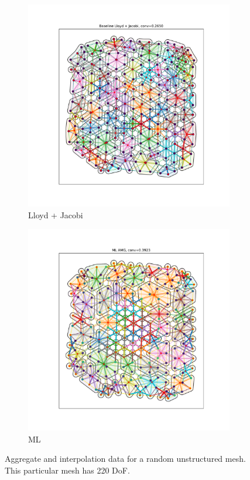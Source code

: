 \documentclass{article}
\begin{document}
\begin{figure}[h]
  \centering
  \begin{subfigure}[t]{0.49\textwidth}
    \centering
    \includegraphics[width=\textwidth]{grid_700_lloyd.pdf}
    \caption{Lloyd + Jacobi}
  \end{subfigure}
  \begin{subfigure}[t]{0.49\textwidth}
    \centering
    \includegraphics[width=\textwidth]{grid_700_ml.pdf}
    \caption{ML}
  \end{subfigure}
  \caption{Aggregate and interpolation data for a random unstructured mesh.  This particular mesh has 220 DoF.}
  \label{fig:grid700}
\end{figure}
\end{document}
